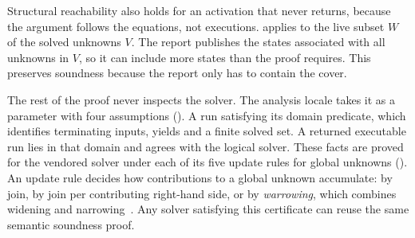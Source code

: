Structural reachability also holds for an activation that never returns, because the argument follows the equations, not executions.
 applies to the live subset $W$ of the solved unknowns $V$.
The report publishes the states associated with all unknowns in $V$, so it
can include more states than the proof requires. This preserves soundness
because the report only has to contain the cover.

The rest of the proof never inspects the solver. The analysis locale takes it
as a parameter with four assumptions (). A run
satisfying its domain predicate, which identifies terminating inputs, yields
 and a finite solved set. A returned executable
run lies in that domain and agrees with the logical solver. These facts are proved for the vendored solver under each of its five
update rules for global unknowns (). An update
rule decides how contributions to a global unknown accumulate: by join, by
join per contributing right-hand side, or by \emph{warrowing}, which combines
widening and narrowing~\cite{tilscher26}. Any solver satisfying this
certificate can reuse the same semantic
soundness proof.
